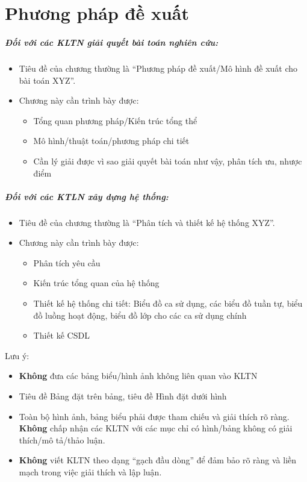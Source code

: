 


\chapter{Phương pháp đề xuất}

\paragraph{Đối với các KLTN giải quyết bài toán nghiên cứu:}

\begin{itemize}
    \item Tiêu đề của chương thường là ``Phương pháp đề xuất/Mô hình đề xuất cho bài toán XYZ''.
    \item Chương này cần trình bày được:
    \begin{itemize}
        \item Tổng quan phương pháp/Kiến trúc tổng thể
        \item Mô hình/thuật toán/phương pháp chi tiết
        \item Cần lý giải được vì sao giải quyết bài toán như vậy, phân tích ưu, nhược điểm
    \end{itemize}
\end{itemize}

\paragraph{Đối với các KTLN xây dựng hệ thống:}
\begin{itemize}
    \item Tiêu đề của chương thường là ``Phân tích và thiết kế hệ thống XYZ''.
    \item Chương này cần trình bày được:
    \begin{itemize}
        \item Phân tích yêu cầu
        \item Kiến trúc tổng quan của hệ thống
        \item Thiết kế hệ thống chi tiết: Biểu đồ ca sử dụng, các biểu đồ tuần tự, biểu đồ luồng hoạt động, biểu đồ lớp cho các ca sử dụng chính
        \item Thiết kế CSDL
    \end{itemize}
\end{itemize}

Lưu ý:
\begin{itemize}
    \item \textbf{Không} đưa các bảng biểu/hình ảnh không liên quan vào KLTN
    \item Tiêu đề Bảng đặt trên bảng, tiêu đề Hình đặt dưới hình
    \item Toàn bộ hình ảnh, bảng biểu phải được tham chiếu và giải thích rõ ràng. \textbf{Không} chấp nhận các KLTN với các mục chỉ có hình/bảng không có giải thích/mô tả/thảo luận.
    \item \textbf{Không} viết KLTN theo dạng ``gạch đầu dòng'' để đảm bảo rõ ràng và liền mạch trong việc giải thích và lập luận.
\end{itemize}
